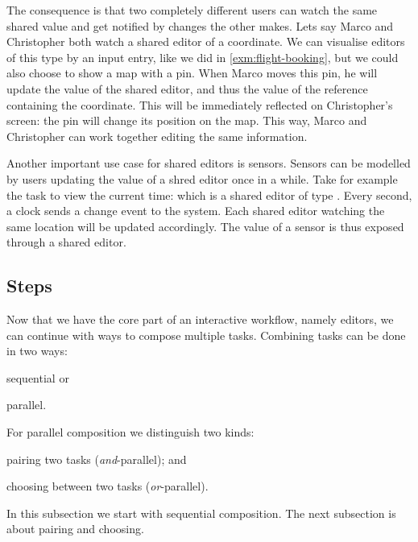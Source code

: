 The consequence is that two completely different users can watch the same shared value
and get notified by changes the other makes.
Lets say Marco and Christopher both watch a shared editor of a coordinate.
We can visualise editors of this type by an input entry,
like we did in \autoref{exm:flight-booking},
but we could also choose to show a map with a pin.
When Marco moves this pin,
he will update the value of the shared editor,
and thus the value of the reference containing the coordinate.
This will be immediately reflected on Christopher's screen:
the pin will change its position on the map.
This way, Marco and Christopher can work together editing the same information.

\label{sub:time}
Another important use case for shared editors is sensors.
Sensors can be modelled by users updating the value of a shred editor once in a while.
Take for example the task to view the current time: 
which is a shared editor of type .
Every second, a clock sends a change event to the system.
Each shared editor watching the same location will be updated accordingly.
The value of a sensor is thus exposed through a shared editor.



\subsection{Steps}


Now that we have the core part of an interactive workflow,
namely editors,
we can continue with ways to compose multiple tasks.
Combining tasks can be done in two ways:
\begin{enumerate*}
  \item sequential or
  \item parallel.
\end{enumerate*}
For parallel composition we distinguish two kinds:
\begin{enumerate*}[(a)]
  \item pairing two tasks (\emph{and}-parallel); and
  \item choosing between two tasks (\emph{or}-parallel).
\end{enumerate*}
In this subsection we start with sequential composition.
The next subsection is about pairing and choosing.



